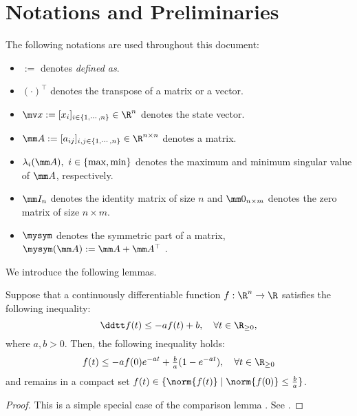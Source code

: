 
\section{Notations and Preliminaries}

The following notations are used throughout this document:
\begin{itemize}
    \item $:=$ denotes \textit{defined as}.
    \item $(\cdot)^\top$ denotes the transpose of a matrix or a vector.
    \item $\bdx:=[x_i]_{i\in\{1,\cdots,n\}}\in\R^n$ denotes the state vector.
    \item $\mm A:=[a_{ij}]_{i,j\in\{1,\cdots,n\}}\in\R^{n\times n}$ denotes a matrix.
    \item $\lambda_{i}(\mm A),\ i\in\{\max,\min\}$ denotes the maximum and minimum singular value of $\mm A$, respectively.
    \item $\mm I_n$ denotes the identity matrix of size $n$ and $\mm 0_{n\times m}$ denotes the zero matrix of size $n\times m$.
    \item $\mysym$ denotes the symmetric part of a matrix, \ie $\mysym(\mm A):=\mm A+\mm A^\top$ \cite{Tsukamoto:2021ac}.
\end{itemize}

We introduce the following lemmas.

\begin{lem}
	Suppose that a continuously differentiable function $f:\R^n\to\R$ satisfies the following inequality:
	\begin{equation}
		\ddtt f(t)\le -a f(t)+ b, \quad \forall t\in\R_{\ge 0}
		,
	\end{equation}
	where $a,b>0$.
	Then, the following inequality holds:
	\begin{equation}
		f(t)\le -af(0)e^{-at} + \tfrac{b}{a}(1-e^{-at}), \quad \forall t\in\R_{\ge 0}
	\end{equation}
	and remains in a compact set $f(t)\in\{\norm{f(t)} \mid \norm{f(0)}\le \tfrac{b}{a}\}$.
	\label{lem:comparison}
\end{lem}

\begin{proof}
	This is a simple special case of the comparison lemma \cite[pp. 102-103]{Khalil:2002aa}.
	See \cite[pp. 659-660]{Khalil:2002aa}.
\end{proof}